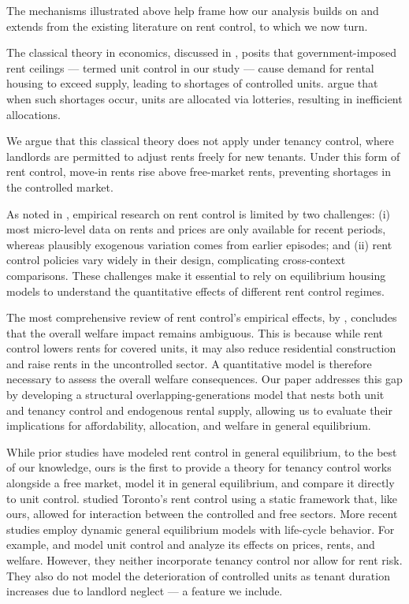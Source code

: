 \documentclass[parskip=full]{article}
\begin{document}
The mechanisms illustrated above help frame how our analysis builds on and extends from the existing literature on rent control, to which we now turn.

The classical theory in economics, discussed in \citet{suen-1989}, posits that government-imposed rent ceilings — termed unit control in our study — cause demand for rental housing to exceed supply, leading to shortages of controlled units. \citet{gl-2003} argue that when such shortages occur, units are allocated via lotteries, resulting in inefficient allocations.

We argue that this classical theory does not apply under tenancy control, where landlords are permitted to adjust rents freely for new tenants. Under this form of rent control, move-in rents rise above free-market rents, preventing shortages in the controlled market.

As noted in \citet{mm-2023}, empirical research on rent control is limited by two challenges: (i) most micro-level data on rents and prices are only available for recent periods, whereas plausibly exogenous variation comes from earlier episodes; and (ii) rent control policies vary widely in their design, complicating cross-context comparisons. These challenges make it essential to rely on equilibrium housing models to understand the quantitative effects of different rent control regimes.

The most comprehensive review of rent control’s empirical effects, by \citet{kholodilin-2024}, concludes that the overall welfare impact remains ambiguous. This is because while rent control lowers rents for covered units, it may also reduce residential construction and raise rents in the uncontrolled sector. A quantitative model is therefore necessary to assess the overall welfare consequences. Our paper addresses this gap by developing a structural overlapping-generations model that nests both unit and tenancy control and endogenous rental supply, allowing us to evaluate their implications for affordability, allocation, and welfare in general equilibrium.

While prior studies have modeled rent control in general equilibrium, to the best of our knowledge, ours is the first to provide a theory for tenancy control works alongside a free market, model it in general equilibrium, and compare it directly to unit control. \citet{fallis-1985} studied Toronto’s rent control using a static framework that, like ours, allowed for interaction between the controlled and free sectors. More recent studies employ dynamic general equilibrium models with life-cycle behavior. For example, \citet{eric-1995} and \citet{fmn-2023} model unit control and analyze its effects on prices, rents, and welfare. However, they neither incorporate tenancy control nor allow for rent risk. They also do not model the deterioration of controlled units as tenant duration increases due to landlord neglect — a feature we include.
\end{document}
